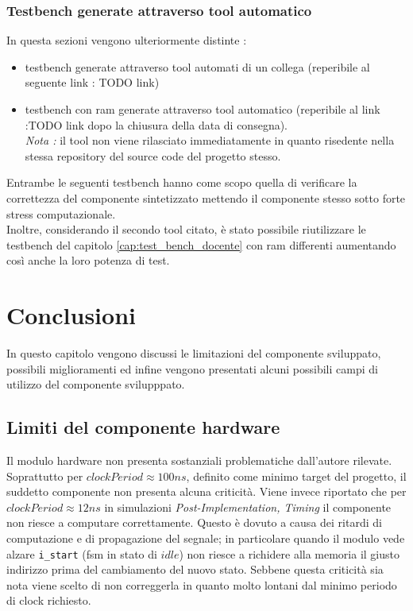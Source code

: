 \documentclass[11pt,a4paper]{article}
\begin{document}
                    \subsubsection{Testbench generate attraverso tool automatico}
                        In questa sezioni vengono ulteriormente distinte :
                        \begin{itemize}
                            \item testbench generate attraverso tool automati di un collega (reperibile al seguente link : TODO link)
                            \item testbench con ram generate attraverso tool automatico (reperibile al link :TODO link   dopo la chiusura della data di consegna).\\\textit{Nota :} il tool non viene rilasciato immediatamente in quanto risedente nella stessa repository del source code del progetto stesso.
                        \end{itemize}
                        Entrambe le seguenti testbench hanno come scopo quella di verificare la correttezza del componente sintetizzato mettendo il componente stesso sotto forte stress computazionale.\\
                        Inoltre, considerando il secondo tool citato, è stato possibile riutilizzare le testbench del capitolo \ref{cap:test_bench_docente} con ram differenti aumentando così anche la loro potenza di test.
    \section{Conclusioni}
            In questo capitolo vengono discussi le limitazioni del componente sviluppato, possibili miglioramenti ed infine vengono presentati alcuni possibili campi di utilizzo del componente svilupppato. 
        \subsection{Limiti del componente hardware}
            Il modulo hardware non presenta sostanziali problematiche dall'autore rilevate. Soprattutto per $clockPeriod \approx 100ns$, definito come minimo target del progetto, il suddetto componente non presenta alcuna criticità.
            Viene invece riportato che per $clockPeriod \approx 12ns$ in simulazioni \textit{Post-Implementation, Timing} il componente non riesce a computare correttamente.
            Questo è dovuto a causa dei ritardi di computazione e di propagazione del segnale; in particolare quando il modulo vede alzare \texttt{i\_start} (fsm in stato di $idle$) non riesce a richidere alla memoria il giusto indirizzo prima del cambiamento del nuovo stato.
            Sebbene questa criticità sia nota viene scelto di non correggerla in quanto molto lontani dal minimo periodo di clock richiesto.
\end{document}
